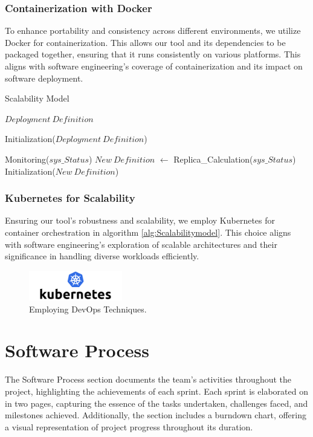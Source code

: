 \documentclass[journal]{IEEEtran}
\begin{document}
\subsubsection{Containerization with Docker}

To enhance portability and consistency across different environments, we utilize Docker for containerization. This allows our tool and its dependencies to be packaged together, ensuring that it runs consistently on various platforms. This aligns with software engineering's coverage of containerization and its impact on software deployment.

\begin{algorithm}[hbt!]
    \caption{Scalability Model}\label{alg:Scalabilitymodel}
    \begin{algorithmic}
    
    \Require $Deployment\ Definition$
  
    \State Initialization($Deployment\ Definition$) 

    \Repeat
        \State Monitoring($sys\_Status$)
        \State $New\ Definition$ $\gets$ Replica\_Calculation($sys\_Status$)
        \State Initialization($New\ Definition$) 
    
    \end{algorithmic}
  \end{algorithm}

\subsubsection{Kubernetes for Scalability}

Ensuring our tool's robustness and scalability, we employ Kubernetes for container orchestration in algorithm \ref{alg:Scalabilitymodel}. This choice aligns with software engineering's exploration of scalable architectures and their significance in handling diverse workloads efficiently.
\begin{figure}[h]
\centering
\includegraphics[width=1.6in]{figures/k8slogo.png}
\caption{Employing DevOps Techniques.}
\label{fig:k8slogo}
\end{figure}


\section{Software Process}
\noindent The Software Process section documents the team's activities throughout the project, highlighting the achievements of each sprint. Each sprint is elaborated on in two pages, capturing the essence of the tasks undertaken, challenges faced, and milestones achieved. Additionally, the section includes a burndown chart, offering a visual representation of project progress throughout its duration.
\end{document}
